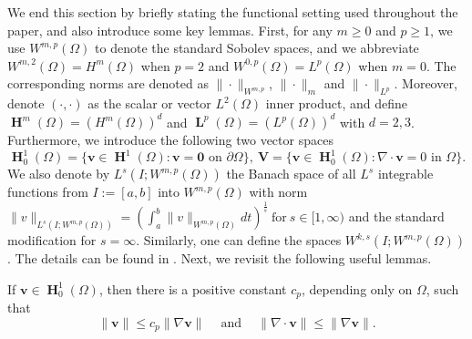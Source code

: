 We end this section by briefly stating the functional setting used throughout the paper, and also introduce some key lemmas. First, for any $m \geq 0$ and $p \ge 1$, we use $W^{m, p}(\Omega)$ to denote the standard Sobolev spaces, and we abbreviate $W^{m, 2}(\Omega)=H^m(\Omega)$ when $p=2$ and $W^{0, p}(\Omega)=L^p(\Omega)$ when $m=0$. The corresponding norms are denoted as $\|\cdot\|_{W^{m, p}}$, $\|\cdot\|_m$ and $\|\cdot\|_{L^p}$. Moreover, denote $(\cdot,\cdot)$ as the scalar or vector $L^2(\Omega)$ inner product, and define $\mbfH^m(\Omega) =(H^m(\Omega))^d$ and $\mbfL^p(\Omega) =(L^p(\Omega))^d$ with $d=2,3$. Furthermore, we introduce the following two vector spaces
\[
\mbfH_0^1(\Omega)=\{\bm v \in \mbfH^1(\Omega): \bm v =\bm 0 \text { on } \partial \Omega\}, ~\mathbf{V}=\{\bm v \in \mbfH_0^1(\Omega): \nabla \cdot  \bm v=0  \text { in } \Omega\}.
\]
We also denote by $L^s(I;W^{m,p}(\Omega))$ the Banach space of all $L^s$ integrable functions from $I:=[a,b]$ into $W^{m,
	p}(\Omega)$ with norm $\|v\|_{L^s(I;W^{m,p}(\Omega))}= \left(\int^b_a \|v\|_{
	W^{m,p}(\Omega)}dt\right)^{\frac{1}{s}}~ \textrm{for}~ s\in
[1,\infty)$ and the standard modification for $s = \infty$.
Similarly, one can define the spaces $W^{k,s}(I;W^{m,p}(\Omega))$. %
The details can be found in \cite{LM72,brenner2008mathematical}.
Next, we revisit the following useful lemmas.
\begin{lemma} \label{lem:poncare} 
	If $ \bm v \in \mbfH_0^1(\Omega)$, then    
	there is a positive constant  $c_p$, depending only on $\Omega$, such that
	$$
	\| \bm v\| \leq c_p \|\nabla  \bm v\|   \quad~\text{and}~\quad 	\|\nabla \cdot  \bm v\| \leq\|\nabla  \bm v\|. 
	$$
\end{lemma}
